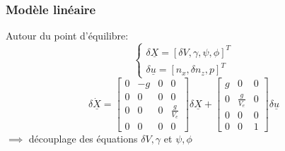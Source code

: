 \documentclass[footheight=2em]{beamer}
\begin{document}
\begin{frame}
    \frametitle{Modèle linéaire} \pause{}
    Autour du point d'équilibre:
    \[
    \left \{
    \begin{array}{c}
        \delta{} \underline{X} = {[\delta V, \gamma, \psi, \phi]}^{T} \\
        \delta{} \underline{u} = {[n_x, \delta n_z, p]}^{T}
    \end{array}
    \right.
    \]
    \[
    \delta \dot{\underline{X}}
    =
    \left[
    \begin{array}{cccc}
        0 & -g & 0 & 0 \\
        0 & 0 & 0 & 0 \\
        0 & 0 & 0 & \frac{g}{V_e} \\
        0 & 0 & 0 & 0
    \end{array}
    \right]
    \delta{} \underline{X}
    +
    \left[
    \begin{array}{cccc}
        g & 0 & 0 \\
        0 & \frac{g}{V_e} & 0 \\
        0 & 0 & 0 \\
        0 & 0 & 1
    \end{array}
    \right]
    \delta{} \underline{u}
    \] \pause{}
    \( \implies \) découplage des équations \( \delta V, \gamma \) et \( \psi, \phi \)
\end{frame}
\end{document}
